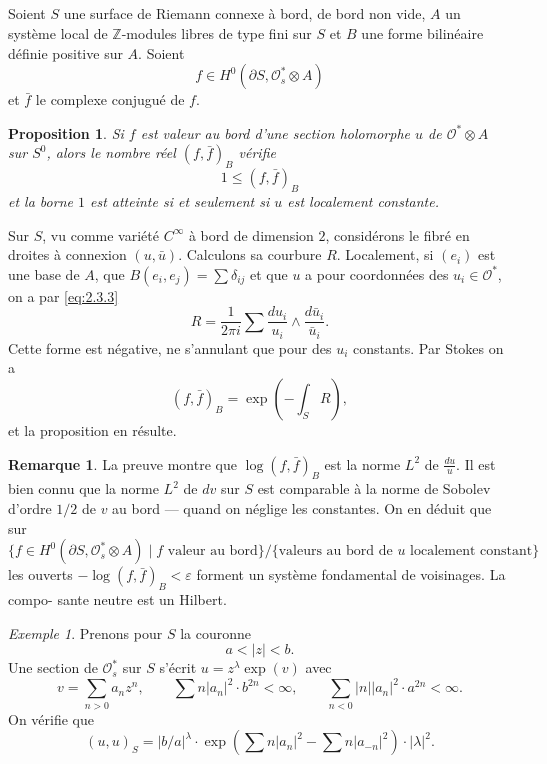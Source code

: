 \documentclass[12pt,a4paper]{article}
\theoremstyle{plain}
\newtheorem{proposition}[theorem]{Proposition}
\theoremstyle{definition}
\newtheorem{remark}[theorem]{Remarque}
\theoremstyle{remark}
\newtheorem{example}[theorem]{Exemple}
\newcommand{\cO}{\mathcal{O}}
\newcommand{\Z}{\mathbb{Z}}
\providecommand{\cO}{\mathcal{O}}
\begin{document}
\subsection{}

Soient $S$ une surface de Riemann connexe à bord, de bord non vide, $A$ un
système local de $\Z$-modules libres de type fini sur $S$ et $B$ une forme bilinéaire définie
positive sur $A$. Soient
\[
f \in H^0(\partial S, \cO_s^* \otimes A)
\]
et $\bar{f}$ le complexe conjugué de $f$.

\begin{proposition}
Si $f$ est valeur au bord d'une section holomorphe $u$ de $\cO^* \otimes A$ sur $S^0$, alors
le nombre réel $(f, \bar{f})_B$ vérifie
\[
1 \leq (f, \bar{f})_B
\]
et la borne $1$ est atteinte si et seulement si $u$ est localement constante.
\end{proposition}

Sur $S$, vu comme variété $C^\infty$ à bord de dimension $2$, considérons le fibré en droites
à connexion $(u, \bar{u})$. Calculons sa courbure $R$. Localement, si $(e_i)$ est une base de $A$, que
$B(e_i, e_j) = \sum \delta_{ij}$ et que $u$ a pour coordonnées des $u_i \in \cO^*$, on a par \eqref{eq:2.3.3}
\[
R = \frac{1}{2\pi i} \sum \frac{du_i}{u_i} \wedge \frac{d\bar{u}_i}{\bar{u}_i}.
\]
Cette forme est négative, ne s'annulant que pour des $u_i$ constants. Par Stokes on a
\[
(f, \bar{f})_B = \exp\left(-\int_S R\right),
\]
et la proposition en résulte.

\begin{remark}
La preuve montre que $\log(f, \bar{f})_B$ est la norme $L^2$ de $\tfrac{du}{u}$. Il
est bien connu que la norme $L^2$ de $dv$ sur $S$ est comparable à la norme de Sobolev
d'ordre $1/2$ de $v$ au bord --- quand on néglige les constantes. On en déduit que sur
\[
\{f \in H^0(\partial S, \cO_s^* \otimes A) \mid f \text{ valeur au bord}\}
/\{\text{valeurs au bord de } u \text{ localement constant}\}
\]
les ouverts $-\log(f, \bar{f})_B < \varepsilon$ forment un système fondamental de voisinages. La compo-
sante neutre est un Hilbert.
\end{remark}

\begin{example}
Prenons pour $S$ la couronne
\[
a < |z| < b.
\]
Une section de $\cO_s^*$ sur $S$ s'écrit $u = z^\lambda \exp(v)$ avec
\[
v = \sum_{n > 0} a_n z^n, \qquad \sum n |a_n|^2 \cdot b^{2n} < \infty, \qquad \sum_{n < 0} |n| |a_n|^2 \cdot a^{2n} < \infty.
\]
On vérifie que
\[
(u, u)_S = |b/a|^\lambda \cdot \exp\left(\sum n |a_n|^2 - \sum n |a_{-n}|^2\right) \cdot |\lambda|^2.
\]
\end{example}
\end{document}

